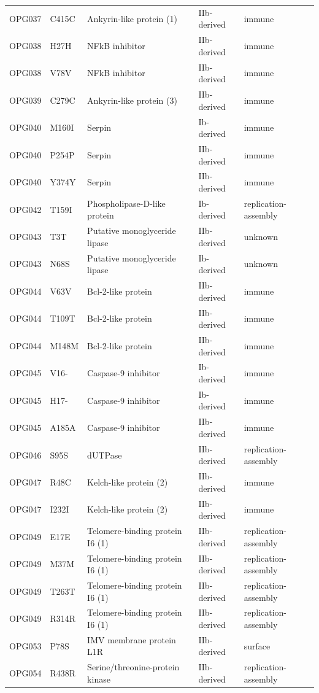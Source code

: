 \documentclass[11pt]{article}
\begin{document}
\begin{longtable}{lllll}
OPG037 & C415C & Ankyrin-like protein (1) & IIb-derived & immune \\
OPG038 & H27H & NFkB inhibitor & IIb-derived & immune \\
OPG038 & V78V & NFkB inhibitor & IIb-derived & immune \\
OPG039 & C279C & Ankyrin-like protein (3) & IIb-derived & immune \\
OPG040 & M160I & Serpin & Ib-derived & immune \\
OPG040 & P254P & Serpin & IIb-derived & immune \\
OPG040 & Y374Y & Serpin & IIb-derived & immune \\
OPG042 & T159I & Phospholipase-D-like protein & Ib-derived & replication-assembly \\
OPG043 & T3T & Putative monoglyceride lipase & IIb-derived & unknown \\
OPG043 & N68S & Putative monoglyceride lipase & Ib-derived & unknown \\
OPG044 & V63V & Bcl-2-like protein & IIb-derived & immune \\
OPG044 & T109T & Bcl-2-like protein & IIb-derived & immune \\
OPG044 & M148M & Bcl-2-like protein & IIb-derived & immune \\
OPG045 & V16- & Caspase-9 inhibitor & Ib-derived & immune \\
OPG045 & H17- & Caspase-9 inhibitor & Ib-derived & immune \\
OPG045 & A185A & Caspase-9 inhibitor & IIb-derived & immune \\
OPG046 & S95S & dUTPase & IIb-derived & replication-assembly \\
OPG047 & R48C & Kelch-like protein (2) & IIb-derived & immune \\
OPG047 & I232I & Kelch-like protein (2) & IIb-derived & immune \\
OPG049 & E17E & Telomere-binding protein I6 (1) & IIb-derived & replication-assembly \\
OPG049 & M37M & Telomere-binding protein I6 (1) & IIb-derived & replication-assembly \\
OPG049 & T263T & Telomere-binding protein I6 (1) & IIb-derived & replication-assembly \\
OPG049 & R314R & Telomere-binding protein I6 (1) & IIb-derived & replication-assembly \\
OPG053 & P78S & IMV membrane protein L1R & IIb-derived & surface \\
OPG054 & R438R & Serine/threonine-protein kinase & IIb-derived & replication-assembly \\

\end{longtable}
\end{document}
